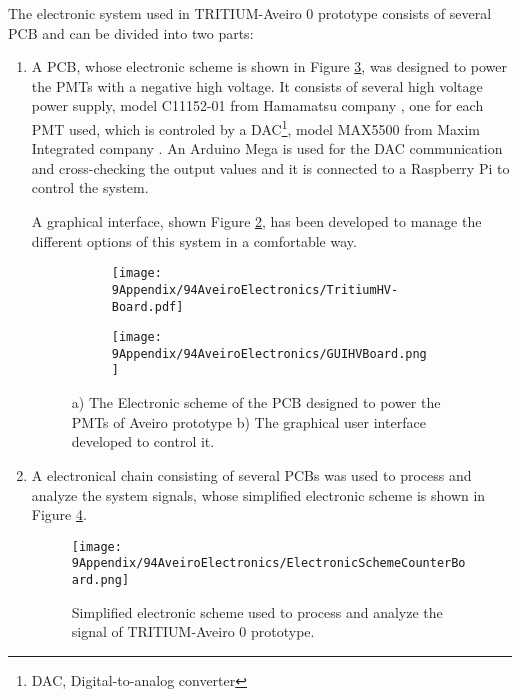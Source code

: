 The electronic system used in TRITIUM-Aveiro 0 prototype consists of several PCB and can be divided into two parts:
\begin{enumerate}
\item{} A PCB, whose electronic scheme is shown in Figure \ref{fig:HVElectronicAveiro}, was designed to power the PMTs with a negative high voltage. It consists of several high voltage power supply, model C11152-01 from Hamamatsu company \cite{PowerSupplyAveiroDataSheet}, one for each PMT used, which is controled by a DAC\footnote{DAC, Digital-to-analog converter}, model MAX5500 from Maxim Integrated company \cite{MAX5500DataSheet}. An Arduino Mega is used for the DAC communication and cross-checking the output values and it is connected to a Raspberry Pi to control the system.

A graphical interface, shown Figure \ref{subfig:GUI}, has been developed to manage the different options of this system in a comfortable way.

\begin{figure}
\centering
    \begin{subfigure}[b]{0.45\textwidth}
    \centering
    \texttt{[image: 9Appendix/94AveiroElectronics/TritiumHV-Board.pdf]}  
    \caption{\label{subfig:ElectronicSchemeHVBoard}}
    \end{subfigure}
    \hfill
    \begin{subfigure}[b]{0.45\textwidth}
    \centering
    \texttt{[image: 9Appendix/94AveiroElectronics/GUIHVBoard.png]}  
    \caption{\label{subfig:GUI}}
    \end{subfigure}
 \caption{a) The Electronic scheme of the PCB designed to power the PMTs of Aveiro prototype b) The graphical user interface developed to control it.}
 \label{fig:HVElectronicAveiro}
\end{figure}

\item{} A electronical chain consisting of several PCBs was used to process and analyze the system signals, whose simplified electronic scheme is shown in Figure \ref{fig:ElectronicSchemCounterBoard}.

\begin{figure}[h]
\centering
\texttt{[image: 9Appendix/94AveiroElectronics/ElectronicSchemeCounterBoard.png]}
\caption{Simplified electronic scheme used to process and analyze the signal of TRITIUM-Aveiro 0 prototype. \label{fig:ElectronicSchemCounterBoard}}
\end{figure}


\end{enumerate}
